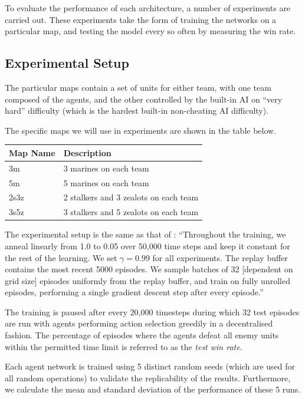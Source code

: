 To evaluate the performance of each architecture, a number of experiments are carried out. These experiments take the form of training the networks on a particular map, and testing the model every so often by measuring the win rate.

\subsection{Experimental Setup}

The particular maps contain a set of units for either team, with one team composed of the agents, and the other controlled by the built-in AI on ``very hard'' difficulty (which is the hardest built-in non-cheating AI difficulty).

The specific maps we will use in experiments are shown in the table below.

\vspace{3mm}
\begin{tabular}{ |p{2.5cm}||p{6.6cm}|  }
 \hline
 \centering Map Name& \centering Description\tabularnewline
 \hline
 \centering 3m   & 3 marines on each team\\
 \hline
 \centering 5m   & 5 marines on each team\\
 \hline
 \centering 2s3z   & 2 stalkers and 3 zealots on each team\\
 \hline
 \centering 3s5z   & 3 stalkers and 5 zealots on each team\\
 \hline
 
\end{tabular}
\vspace{3mm}

The experimental setup is the same as that of \cite{smac}: ``Throughout the training, we anneal linearly from 1.0 to 0.05 over 50,000 time steps and keep it constant for the rest of the learning. We set $\gamma= 0.99$ for all experiments. The replay buffer contains the most recent 5000 episodes.  We sample batches of 32 [dependent on grid size] episodes uniformly from the replay buffer, and train on fully unrolled episodes, performing a single gradient descent step after every episode.'' 

The training is paused after every 20,000 timesteps during which 32 test episodes are run with agents performing action selection greedily in a decentralised fashion. The percentage of episodes where the agents defeat all enemy units within the permitted time limit is referred to as the \textit{test win rate}.

Each agent network is trained using 5 distinct random seeds (which are used for all random operations) to validate the replicability of the results. Furthermore, we calculate the mean and standard deviation of the performance of these 5 runs.

